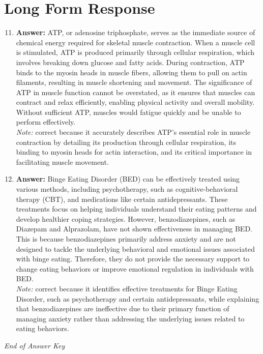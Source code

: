 \documentclass[12pt]{article}
\begin{document}
\section*{Long Form Response}
\begin{enumerate}[label=\arabic*.]
\setcounter{enumi}{10}
\item \textbf{Answer:} ATP, or adenosine triphosphate, serves as the immediate source of chemical energy required for skeletal muscle contraction. When a muscle cell is stimulated, ATP is produced primarily through cellular respiration, which involves breaking down glucose and fatty acids. During contraction, ATP binds to the myosin heads in muscle fibers, allowing them to pull on actin filaments, resulting in muscle shortening and movement. The significance of ATP in muscle function cannot be overstated, as it ensures that muscles can contract and relax efficiently, enabling physical activity and overall mobility. Without sufficient ATP, muscles would fatigue quickly and be unable to perform effectively.
\\ \textit{Note:} correct because it accurately describes ATP's essential role in muscle contraction by detailing its production through cellular respiration, its binding to myosin heads for actin interaction, and its critical importance in facilitating muscle movement.
\item \textbf{Answer:} Binge Eating Disorder (BED) can be effectively treated using various methods, including psychotherapy, such as cognitive-behavioral therapy (CBT), and medications like certain antidepressants. These treatments focus on helping individuals understand their eating patterns and develop healthier coping strategies. However, benzodiazepines, such as Diazepam and Alprazolam, have not shown effectiveness in managing BED. This is because benzodiazepines primarily address anxiety and are not designed to tackle the underlying behavioral and emotional issues associated with binge eating. Therefore, they do not provide the necessary support to change eating behaviors or improve emotional regulation in individuals with BED.
\\ \textit{Note:} correct because it identifies effective treatments for Binge Eating Disorder, such as psychotherapy and certain antidepressants, while explaining that benzodiazepines are ineffective due to their primary function of managing anxiety rather than addressing the underlying issues related to eating behaviors.
\end{enumerate}

\vfill
\noindent\textit{End of Answer Key}
\end{document}
